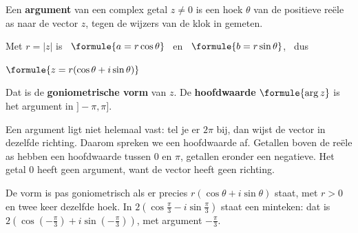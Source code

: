 \begin{theorie}
\begin{minipage}[t]{.57\linewidth}
\vspace{0pt}
Een \textbf{\textcolor{accent}{argument}} van een complex getal $z \neq 0$ is een hoek $\theta$ van de positieve reële as naar de vector $z$, tegen de wijzers van de klok in gemeten.

\vspace{1mm}
Met $r = |z|$ is \ $\formule{a = r\cos\theta}$ \ en \ $\formule{b = r\sin\theta}$, \ dus

\vspace{1mm}
\qquad $\formule{z = r(\cos\theta + i\sin\theta)}$

\vspace{1mm}
Dat is de \textbf{\textcolor{accent}{goniometrische vorm}} van $z$. De \textbf{\textcolor{accent}{hoofdwaarde}} $\formule{\arg z}$ is het argument in $]-\pi, \pi]$.
\end{minipage}\hfill
\begin{minipage}[t]{.38\linewidth}
\vspace{0pt}
\end{minipage}
\end{theorie}

Een argument ligt niet helemaal vast: tel je er $2\pi$ bij, dan wijst de vector in dezelfde richting. Daarom spreken we een hoofdwaarde af. Getallen boven de reële as hebben een hoofdwaarde tussen 0 en $\pi$, getallen eronder een negatieve. Het getal 0 heeft geen argument, want de vector heeft geen richting.

De vorm is pas goniometrisch als er precies $r(\cos\theta + i\sin\theta)$ staat, met $r > 0$ en twee keer dezelfde hoek. In $2(\cos\frac{\pi}{3} - i\sin\frac{\pi}{3})$ staat een minteken: dat is $2(\cos(-\frac{\pi}{3}) + i\sin(-\frac{\pi}{3}))$, met argument $-\frac{\pi}{3}$.

